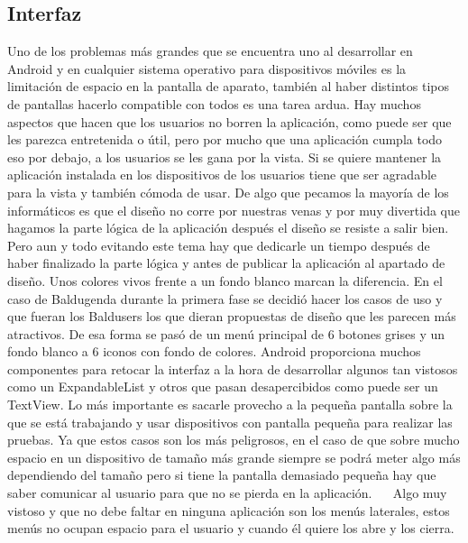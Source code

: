 \subsection{Interfaz}
\label{subsecc:Interfaz}

Uno de los problemas más grandes que se encuentra uno al desarrollar en Android y en cualquier sistema operativo para dispositivos móviles es la limitación de espacio en la pantalla de aparato, también al haber distintos tipos de pantallas hacerlo compatible con todos es una tarea ardua.
Hay muchos aspectos que hacen que los usuarios no borren la aplicación, como puede ser que les parezca entretenida o útil, pero por mucho que una aplicación cumpla todo eso por debajo, a los usuarios se les gana por la vista. Si se quiere mantener la aplicación instalada en los dispositivos de los usuarios tiene que ser agradable para la vista y también cómoda de usar.
De algo que pecamos la mayoría de los informáticos es que el diseño no corre por nuestras venas y por muy divertida que hagamos la parte lógica de la aplicación después el diseño se resiste a salir bien.
Pero aun y todo evitando este tema hay que dedicarle un tiempo después de haber finalizado la parte lógica y antes de publicar la aplicación al apartado de diseño.
Unos colores vivos frente a un fondo blanco marcan la diferencia.
En el caso de Baldugenda durante la primera fase se decidió hacer los casos de uso y que fueran los Baldusers los que dieran propuestas de diseño que les parecen más atractivos.
De esa forma se pasó de un menú principal de 6 botones grises y un fondo blanco a 6 iconos con fondo de colores.
Android proporciona muchos componentes para retocar la interfaz a la hora de desarrollar algunos tan vistosos como un ExpandableList y otros que pasan desapercibidos como puede ser un TextView.
Lo más importante es sacarle provecho a la pequeña pantalla sobre la que se está trabajando y usar dispositivos con pantalla pequeña para realizar las pruebas. Ya que estos casos son los más peligrosos, en el caso de que sobre mucho espacio en un dispositivo de tamaño más grande siempre se podrá meter algo más dependiendo del tamaño pero si tiene la pantalla demasiado pequeña hay que saber comunicar al usuario para que no se pierda en la aplicación.
 
Algo muy vistoso y que no debe faltar en ninguna aplicación son los menús laterales, estos menús no ocupan espacio para el usuario y cuando él quiere los abre y los cierra.
\newpage
